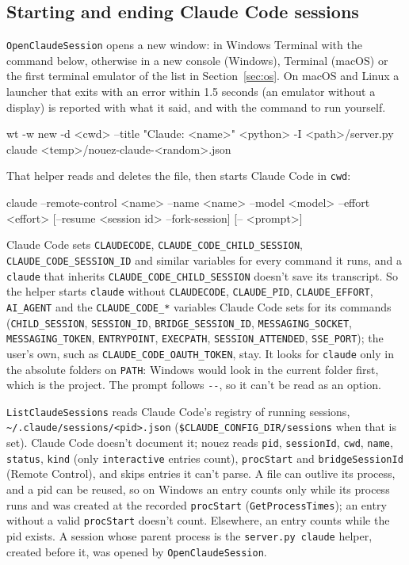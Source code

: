\documentclass[10pt,a4paper]{article}
\newcommand{\code}[1]{\texttt{#1}}
\begin{document}
\subsection{Starting and ending Claude Code sessions}
\label{sec:claude-os}

\code{OpenClaudeSession} opens a new window: in Windows Terminal with the command below,
otherwise in a new console (Windows), Terminal (macOS) or the first terminal emulator of the
list in Section~\ref{sec:os}. On macOS and Linux a launcher that exits with an error within 1.5
seconds (an emulator without a display) is reported with what it said, and with the command to run
yourself.

\begin{plain}
wt -w new -d <cwd> --title "Claude: <name>"
  <python> -I <path>/server.py claude <temp>/nouez-claude-<random>.json
\end{plain}

That helper reads and deletes the file, then starts Claude Code in \code{cwd}:

\begin{plain}
claude --remote-control <name> --name <name> --model <model> --effort <effort>
  [--resume <session id> --fork-session] [-- <prompt>]
\end{plain}

Claude Code sets \code{CLAUDECODE}, \code{CLAUDE\_CODE\_CHILD\_SESSION},
\code{CLAUDE\_CODE\_SESSION\_ID} and similar variables for every command it runs, and a
\code{claude} that inherits \code{CLAUDE\_CODE\_CHILD\_SESSION} doesn't save its transcript. So the
helper starts \code{claude} without \code{CLAUDECODE}, \code{CLAUDE\_PID}, \code{CLAUDE\_EFFORT},
\code{AI\_AGENT} and the \code{CLAUDE\_CODE\_*} variables Claude Code sets for its commands
(\code{CHILD\_SESSION}, \code{SESSION\_ID}, \code{BRIDGE\_SESSION\_ID}, \code{MESSAGING\_SOCKET},
\code{MESSAGING\_TOKEN}, \code{ENTRYPOINT}, \code{EXECPATH}, \code{SESSION\_ATTENDED},
\code{SSE\_PORT}); the user's own, such as \code{CLAUDE\_CODE\_OAUTH\_TOKEN}, stay. It looks for
\code{claude} only in the absolute folders on \code{PATH}: Windows would look in the current
folder first, which is the project. The prompt follows \code{-{}-}, so it can't be read as an option.

\code{ListClaudeSessions} reads Claude Code's registry of running sessions,
\code{\textasciitilde/.claude/sessions/<pid>.json} (\code{\$CLAUDE\_CONFIG\_DIR/sessions} when that is set). Claude Code doesn't document it; nouez reads
\code{pid}, \code{sessionId}, \code{cwd}, \code{name}, \code{status}, \code{kind} (only
\code{interactive} entries count), \code{procStart} and \code{bridgeSessionId} (Remote Control),
and skips entries it can't parse. A file can outlive its process, and a pid can be reused, so on
Windows an entry counts only while its process runs and was created at the recorded
\code{procStart} (\code{GetProcessTimes}); an entry without a valid \code{procStart} doesn't count.
Elsewhere, an entry counts while the pid exists. A session whose parent process is the
\code{server.py claude} helper, created before it, was opened by \code{OpenClaudeSession}.
\end{document}
